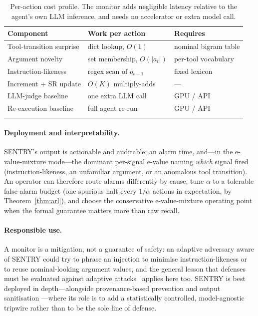 \documentclass[pdflatex,sn-mathphys-num]{sn-jnl}%
\theoremstyle{thmstyleone}%
\theoremstyle{thmstyletwo}%
\theoremstyle{thmstylethree}%
\begin{document}
\begin{table}[t]
\centering
\caption{Per-action cost profile. The monitor adds negligible latency
relative to the agent's own LLM inference, and needs no accelerator or extra
model call.}\label{tab:cost}
\begin{tabular}{@{}lll@{}}
\toprule
Component & Work per action & Requires \\
\midrule
Tool-transition surprise & dict lookup, \(O(1)\) & nominal bigram table \\
Argument novelty & set membership, \(O(|a_t|)\) & per-tool vocabulary \\
Instruction-likeness & regex scan of \(o_{t-1}\) & fixed lexicon \\
Increment + SR update & \(O(K)\) multiply-adds & --- \\
\midrule
LLM-judge baseline & one extra LLM call & GPU / API \\
Re-execution baseline~\cite{zhu2025melon} & full agent re-run & GPU / API \\
\botrule
\end{tabular}
\end{table}

\paragraph{Deployment and interpretability.} SENTRY's output is
actionable and auditable: an alarm time, and---in the e-value-mixture
mode---the dominant per-signal e-value naming \emph{which} signal fired
(instruction-likeness, an unfamiliar argument, or an anomalous tool
transition). An operator can therefore route alarms differently by cause, tune
\(\alpha\) to a tolerable false-alarm budget (one spurious halt every
\(1/\alpha\) actions in expectation, by Theorem~\ref{thm:arl}), and choose the
conservative e-value-mixture operating point when the formal guarantee matters
more than raw recall.

\paragraph{Responsible use.} A monitor is a mitigation, not a guarantee of
safety: an adaptive adversary aware of SENTRY could try to phrase an injection
to minimise instruction-likeness or to reuse nominal-looking argument values,
and the general lesson that defenses must be evaluated against adaptive
attacks~\cite{nasr2025attackersecond} applies here too. SENTRY is best
deployed in depth---alongside provenance-based prevention
\cite{debenedetti2025camel} and output sanitisation
\cite{das2025commandsans}---where its role is to add a statistically
controlled, model-agnostic tripwire rather than to be the sole line of
defense.
\end{document}

